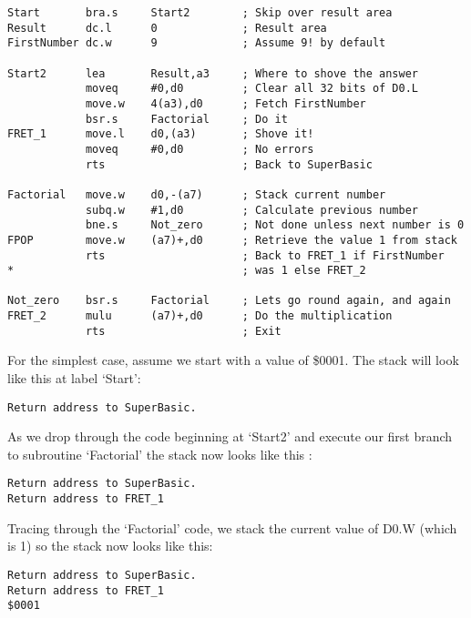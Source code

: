 \begin{lstlisting}[firstnumber=1,caption={Recursive Factorial Program}]
Start       bra.s     Start2        ; Skip over result area
Result      dc.l      0             ; Result area
FirstNumber dc.w      9             ; Assume 9! by default

Start2      lea       Result,a3     ; Where to shove the answer
            moveq     #0,d0         ; Clear all 32 bits of D0.L
            move.w    4(a3),d0      ; Fetch FirstNumber
            bsr.s     Factorial     ; Do it
FRET_1      move.l    d0,(a3)       ; Shove it!
            moveq     #0,d0         ; No errors
            rts                     ; Back to SuperBasic

Factorial   move.w    d0,-(a7)      ; Stack current number
            subq.w    #1,d0         ; Calculate previous number
            bne.s     Not_zero      ; Not done unless next number is 0
FPOP        move.w    (a7)+,d0      ; Retrieve the value 1 from stack
            rts                     ; Back to FRET_1 if FirstNumber 
*                                   ; was 1 else FRET_2

Not_zero    bsr.s     Factorial     ; Lets go round again, and again
FRET_2      mulu      (a7)+,d0      ; Do the multiplication
            rts                     ; Exit
\end{lstlisting}

For the simplest case, assume we start with a value of \$0001. The
      stack will look like this at label `Start':

\begin{lstlisting}[firstnumber=1,frame=none,numbers=none]
Return address to SuperBasic.
\end{lstlisting}

As we drop through the code beginning at `Start2' and execute our
      first branch to subroutine `Factorial' the stack now looks like this
     :

\begin{lstlisting}[firstnumber=1,frame=none,numbers=none]
Return address to SuperBasic.
Return address to FRET_1
\end{lstlisting}

Tracing through the `Factorial' code, we stack the current value
      of D0.W (which is 1) so the stack now looks like this:

\begin{lstlisting}[firstnumber=1,frame=none,numbers=none]
Return address to SuperBasic.
Return address to FRET_1
$0001
\end{lstlisting}

